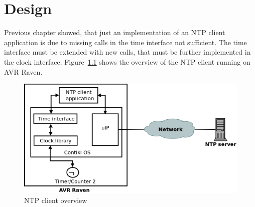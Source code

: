 
\chapter{Design}
Previous chapter showed, that just an implementation of an
NTP client application is due to missing calls in the time interface not sufficient.
The time interface must be extended with new calls,
that must be further implemented in the clock interface.
Figure~\ref{fig:design-overview} shows the overview of the NTP client running on AVR Raven.

\begin{figure}[H]
  \centering
  \includegraphics[width=13cm,keepaspectratio]{fig/design.png}
  \caption{NTP client overview} %
  \label{fig:design-overview} %
\end{figure}





%


%

